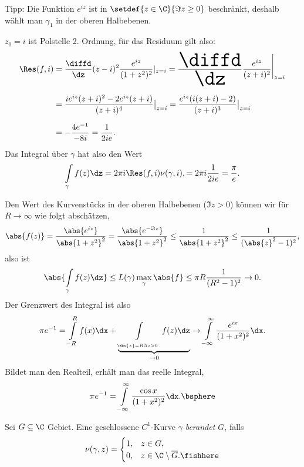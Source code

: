 \begin{bsp}
\begin{enumerate}[label=\arabic{*}.)]
  Tipp: Die Funktion $e^{iz}$ ist in $\setdef{z\in\C}{\Im z \ge 0}$ beschränkt,
  deshalb wählt man $\gamma_1$ in der oberen Halbebenen.
  
  $z_0 = i$ ist Polstelle 2. Ordnung, für das Residuum gilt also:
  \begin{align*}
  \Res (f,i) &= \frac{\diffd}{\dz}(z-i)^2\frac{e^{iz}}{(1+z^2)^2}\Huge|_{z=i}
  = \frac{\diffd}{\dz}\frac{e^{iz}}{(z+i)^2}\big|_{z=i}
  \\ &= \frac{ie^{iz}(z+i)^2 - 2e^{iz}(z+i)}{(z+i)^4}\big|_{z=i}
  = \frac{e^{iz}(i(z+i)-2)}{(z+i)^3}\big|_{z=i}\\ &
  = -\frac{4e^{-1}}{-8i} = \frac{1}{2ie}.
  \end{align*}
  Das Integral über $\gamma$ hat also den Wert
  \begin{align*}
  \int\limits_\gamma f(z)\dz = 2\pi i \Res(f,i)\nu(\gamma,i),
  = 2\pi i \frac{1}{2ie} = \frac{\pi}{e}.
  \end{align*}

Den Wert des Kurvenstücks  in der oberen Halbebenen ($\Im z > 0$) können wir
für $R\to\infty$ wie folgt abschätzen,
\begin{align*}
\abs{f(z)} = \frac{\abs{e^{iz}}}{\abs{1+z^2}^2} = \frac{\abs{e^{-\Im
z}}}{\abs{1+z^2}^2} \le \frac{1}{\abs{1+z^2}^2} \le \frac{1}{(\abs{z}^2-1)^2},
\end{align*}
also ist
\begin{align*}
\abs{\int\limits_\gamma f(z)\dz } \le L(\gamma) \max\limits_{\gamma} \abs{f}
\le \pi R \frac{1}{(R^2-1)^2} \to 0.
\end{align*}
Der Grenzwert des Integral ist also
\begin{align*}
\pi e^{-1} = \int\limits_{-R}^R f(x)\dx +
\underbrace{\int\limits_{\atop{\abs{z}=R}{\Im z > 0}} f(z)\dz}_{\to 0} \to
\int\limits_{-\infty}^\infty \frac{e^{ix}}{(1+x^2)^2}\dx.
\end{align*}
Bildet man den Realteil, erhält man das reelle Integral,
\begin{align*}
\pi e^{-1} = \int\limits_{-\infty}^\infty \frac{\cos x}{(1+x^2)^2}\dx.\bsphere
\end{align*}
\end{enumerate}
\end{bsp}

\begin{defn}
\label{defn:2.94}
Sei $G\subseteq \C$ Gebiet. Eine geschlossene $C^1$-Kurve $\gamma$
\emph{berandet $G$}, falls
\begin{align*}
\nu(\gamma,z) = \begin{cases}
                1, & z\in G,\\
                0, & z\in \C\setminus\overline{G}.\fishhere
                \end{cases}
\end{align*}
\end{defn}

